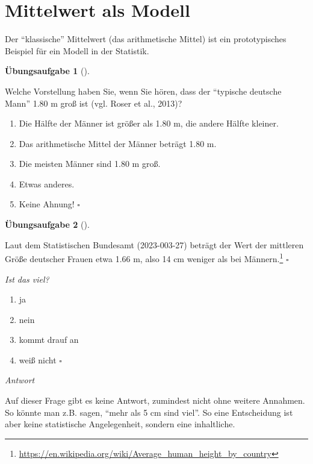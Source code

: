 \documentclass[
  letterpaper,
  twoside,
  open=any]{scrbook}
\providecommand{\tightlist}{%
  \setlength{\itemsep}{0pt}\setlength{\parskip}{0pt}}\usepackage{longtable,booktabs,array}
\theoremstyle{definition}
\newtheorem{exercise}{Übungsaufgabe}[chapter]
\theoremstyle{definition}
\theoremstyle{definition}
\theoremstyle{remark}
\begin{document}
\section{Mittelwert als Modell}\label{sec-mw}

Der \enquote{klassische} Mittelwert (das arithmetische Mittel) ist ein
prototypisches Beispiel für ein Modell in der Statistik.

\begin{exercise}[]\protect\hypertarget{exr-mw-md-mod}{}\label{exr-mw-md-mod}

Welche Vorstellung haben Sie, wenn Sie hören, dass der \enquote{typische
deutsche Mann} 1.80 m groß ist (vgl. Roser et al., 2013)?

\begin{enumerate}
\def\labelenumi{\alph{enumi})}
\tightlist
\item
  Die Hälfte der Männer ist größer als 1.80 m, die andere Hälfte
  kleiner.
\item
  Das arithmetische Mittel der Männer beträgt 1.80 m.
\item
  Die meisten Männer sind 1.80 m groß.
\item
  Etwas anderes.
\item
  Keine Ahnung! \(\square\)
\end{enumerate}

\end{exercise}

\begin{exercise}[]\protect\hypertarget{exr-mw2}{}\label{exr-mw2}

Laut dem Statistischen Bundesamt (2023-003-27) beträgt der Wert der
mittleren Größe deutscher Frauen etwa 1.66 m, also 14 cm weniger als bei
Männern.\footnote{\url{https://en.wikipedia.org/wiki/Average_human_height_by_country}}
\(\square\)

\emph{Ist das viel?}

\begin{enumerate}
\def\labelenumi{\alph{enumi})}
\tightlist
\item
  ja
\item
  nein
\item
  kommt drauf an
\item
  weiß nicht \(\square\)
\end{enumerate}

\emph{Antwort}

Auf dieser Frage gibt es keine Antwort, zumindest nicht ohne weitere
Annahmen. So könnte man z.B. sagen, \enquote{mehr als 5 cm sind viel}.
So eine Entscheidung ist aber keine statistische Angelegenheit, sondern
eine inhaltliche.

\end{exercise}
\end{document}
